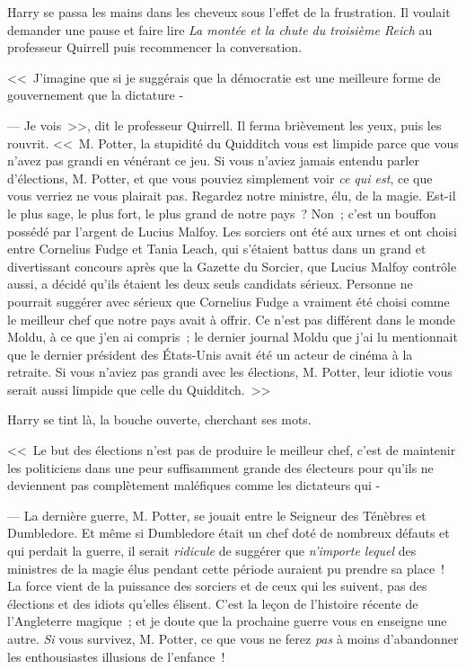 Harry se passa les mains dans les cheveux sous l'effet de la frustration. Il voulait demander une pause et faire lire \emph{La montée et la chute du troisième Reich} au professeur Quirrell puis recommencer la conversation.

<<~J'imagine que si je suggérais que la démocratie est une meilleure forme de gouvernement que la dictature -

--- Je vois~>>, dit le professeur Quirrell. Il ferma brièvement les yeux, puis les rouvrit. <<~M. Potter, la stupidité du Quidditch vous est limpide parce que vous n'avez pas grandi en vénérant ce jeu. Si vous n'aviez jamais entendu parler d'élections, M. Potter, et que vous pouviez simplement voir \emph{ce qui est}, ce que vous verriez ne vous plairait pas. Regardez notre ministre, élu, de la magie. Est-il le plus sage, le plus fort, le plus grand de notre pays~? Non~; c'est un bouffon possédé par l'argent de Lucius Malfoy. Les sorciers ont été aux urnes et ont choisi entre Cornelius Fudge et Tania Leach, qui s'étaient battus dans un grand et divertissant concours après que la Gazette du Sorcier, que Lucius Malfoy contrôle aussi, a décidé qu'ils étaient les deux seuls candidats sérieux. Personne ne pourrait suggérer avec sérieux que Cornelius Fudge a vraiment été choisi comme le meilleur chef que notre pays avait à offrir. Ce n'est pas différent dans le monde Moldu, à ce que j'en ai compris~; le dernier journal Moldu que j'ai lu mentionnait que le dernier président des États-Unis avait été un acteur de cinéma à la retraite. Si vous n'aviez pas grandi avec les élections, M. Potter, leur idiotie vous serait aussi limpide que celle du Quidditch.~>>

Harry se tint là, la bouche ouverte, cherchant ses mots.

<<~Le but des élections n'est pas de produire le meilleur chef, c'est de maintenir les politiciens dans une peur suffisamment grande des électeurs pour qu'ils ne deviennent pas complètement maléfiques comme les dictateurs qui -

--- La dernière guerre, M. Potter, se jouait entre le Seigneur des Ténèbres et Dumbledore. Et même si Dumbledore était un chef doté de nombreux défauts et qui perdait la guerre, il serait \emph{ridicule} de suggérer que \emph{n'importe lequel} des ministres de la magie élus pendant cette période auraient pu prendre sa place~! La force vient de la puissance des sorciers et de ceux qui les suivent, pas des élections et des idiots qu'elles élisent. C'est la leçon de l'histoire récente de l'Angleterre magique~; et je doute que la prochaine guerre vous en enseigne une autre. \emph{Si} vous survivez, M. Potter, ce que vous ne ferez \emph{pas} à moins d'abandonner les enthousiastes illusions de l'enfance~!

